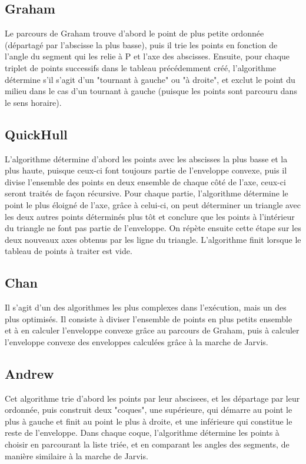 \documentclass[final]{beamer}
\begin{document}
\begin{frame}[t]
\begin{multicols}{3}
\subsection{Graham}
Le parcours de Graham trouve d'abord le point de plus petite ordonnée (départagé par l'abscisse la plus basse), puis il trie les points en fonction de l'angle du segment qui les relie à P et l'axe des abscisses. Ensuite, pour chaque triplet de points successifs dans le tableau précédemment créé, l'algorithme détermine s'il s'agit d'un "tournant à gauche" ou "à droite", et exclut le point du milieu dans le cas d'un tournant à gauche (puisque les points sont parcouru dans le sens horaire).

\subsection{QuickHull}
L'algorithme détermine d'abord les points avec les abscisses la plus basse et la plus haute, puisque ceux-ci font toujours partie de l'enveloppe convexe, puis il divise l'ensemble des points en deux ensemble de chaque côté de l'axe, ceux-ci seront traités de façon récursive. Pour chaque partie, l'algorithme détermine le point le plus éloigné de l'axe, grâce à celui-ci, on peut déterminer un triangle avec les deux autres points déterminés plus tôt et conclure que les points à l'intérieur du triangle ne font pas partie de l'enveloppe. On répète ensuite cette étape sur les deux nouveaux axes obtenus par les ligne du triangle. L'algorithme finit lorsque le tableau de points à traiter est vide.

\subsection{Chan}

Il s'agit d'un des algorithmes les plus complexes dans l'exécution, mais un des plus optimisés. Il consiste à diviser l'ensemble de points en plus petits ensemble et à en calculer l'enveloppe convexe grâce au parcours de Graham, puis à calculer l'enveloppe convexe des enveloppes calculées grâce à la marche de Jarvis.

\subsection{Andrew}
Cet algorithme trie d'abord les points par leur abscisees, et les départage par leur ordonnée, puis construit deux "coques", une supérieure, qui démarre au point le plus à gauche et finit au point le plus à droite, et une inférieure qui constitue le reste de l'enveloppe. Dans chaque coque, l'algorithme détermine les points à choisir en parcourant la liste triée, et en comparant les angles des segments, de manière similaire à la marche de Jarvis.


\end{multicols}
\end{frame}
\end{document}
